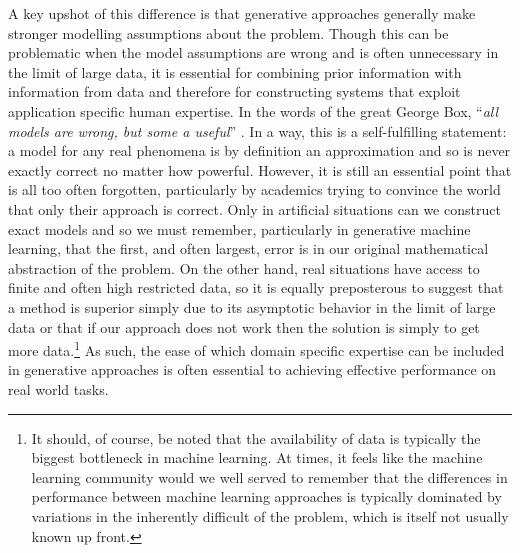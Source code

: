 A key upshot of this difference
is that generative approaches generally make stronger modelling assumptions about the problem.  Though
this can be problematic when the model assumptions are wrong and is often unnecessary in
the limit of large data, it is essential for combining prior information with information from data
and therefore for constructing systems that exploit application specific human expertise.
In the words of the great George Box, ``\textit{all models are wrong, but some a useful}''
\citep{box1979robustness,box2005statistics}.  In a way, this is a self-fulfilling statement: a model for
any real phenomena
is by definition an approximation and so is never exactly correct no matter how powerful.  However,
it is still an essential point that is all too often forgotten, particularly by academics trying to convince
the world that only their approach is correct.  Only in artificial situations can we construct exact models
and so we must remember, particularly in generative machine learning, that the first, and often largest,
error is in our original mathematical abstraction of the problem.  On the other hand, real situations
have access to finite and often high restricted data, so it is equally preposterous to suggest that a
method is superior simply due to its asymptotic behavior in the limit of large data or that if our approach
does not work then the solution is simply to get more data.\footnote{It should, of course, be noted
	that the availability of data is typically the biggest bottleneck in machine learning.  At times, it feels 
	like the machine learning community would we well served to remember that the differences in performance between
	machine learning approaches is typically dominated by variations in the inherently difficult of the
	problem, which is itself not usually known up front.}  As such, the ease of which domain specific
expertise can be included in generative approaches is often essential to achieving effective performance
on real world tasks.


